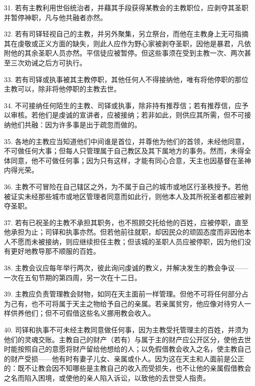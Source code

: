 31. 若有主教利用世俗统治者，并藉其手段获得某教会的主教职位，应剥夺其圣职并暂停神职，凡与他共融者亦然。\par

32. 若有司铎轻视自己的主教，并另外聚集，另立祭台，而他在主教身上无可指摘其在虔敬或正义方面的缺失，则此人应作为野心家被剥夺圣职，因他是暴君，凡依附他的其余圣职人员亦然。平信徒应被暂停。但这些事须在受到主教一次、两次甚至三次劝诫之后方可执行。\par

33. 若有司铎或执事被其主教停职，其他任何人不得接纳他，唯有将他停职的那位主教可以，除非将他停职的主教去世。\par

34. 不可接纳任何陌生的主教、司铎或执事，除非持有推荐信；若有推荐信，应予以审核。若他们是虔诚的宣讲者，应被接纳；若非如此，则供应其所需，但不可接纳他们共融：因为许多事是出于疏忽而做的。\par

35. 各地的主教应当知道他们中间谁是首位，并尊他为他们的首领，未经他同意，不可做任何大事；但每人只管理属于自己教区及其下属地方的事务。然而，未得全体同意，他不可做任何事；因为只有这样，才能有同心合意，天主也因基督在圣神内得光荣。\par

36. 主教不可冒险在自己辖区之外，为不属于自己的城市或地区行圣秩授予。若他被证实未经那些城市或地区管理者同意而如此行，则他本人及其所祝圣者都应被剥夺圣职。\par

37. 若有已祝圣的主教不承担其职务，也不照顾交托给他的百姓，应被停职，直至他承担为止；司铎和执事亦然。但若他前往就职，却因民众的顽固态度而非因他本人不愿而未被接纳，则应继续担任主教；但该城的圣职人员应被停职，因为他们没有更好地教导那不顺服的百姓。\par

38. 主教会议应每年举行两次，彼此询问虔诚的教义，并解决发生的教会争议——一次在五旬节期的第四周，另一次在十二日。\par

39. 主教应负责管理教会财物，如同在天主面前一样管理。但他不可将任何部分占为己有，也不可将属于天主之物给予自己的亲属。若亲属贫穷，他应像对待穷人一样供养他们；但不可假借这些名义挪用教会收入。\par

40. 司铎和执事不可未经主教同意做任何事，因为主教受托管理主的百姓，并须为他们的灵魂交账。主教自己的财产（若有）与属于主的财产应公开区分，使他去世时能按照自己的意愿将财产留给他想给的人；以免假借教会收入之名，使主教自己的财产受损——他有时有妻子儿女、亲属或仆人。因为这在天主和人面前是公正的：既不让教会因不知哪些是主教自己的收入而受损失，也不让他的亲属假借教会之名而陷入困境，或使他的亲人陷入诉讼，以致他的去世受人指责。\par

